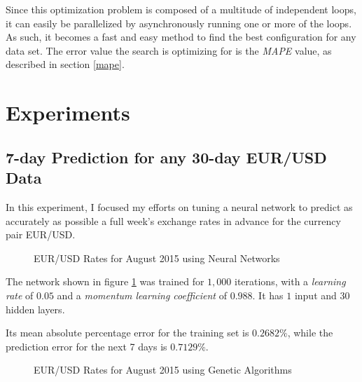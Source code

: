 \documentclass[a4paper,12pt]{article}
\begin{document}
	Since this optimization problem is composed of a multitude of independent loops, it can easily be parallelized by asynchronously running one or more of the loops. As such, it becomes a fast and easy method to find the best configuration for any data set. The error value the search is optimizing for is the \textit{MAPE} value, as described in section \ref{mape}.
	
\section{Experiments}
\subsection{7-day Prediction for any 30-day EUR/USD Data} \label{pred730nn}
	
	In this experiment, I focused my efforts on tuning a neural network to predict as accurately as possible a full week's exchange rates in advance for the currency pair EUR/USD.
	
	\begin{figure}[!htbp]
		\centering
		\caption{EUR/USD Rates for August 2015 using Neural Networks}
		\label{eur_usd_august_30_neuron}
	\end{figure}
	
	The network shown in figure \ref{eur_usd_august_30_neuron} was trained for $1,000$ iterations, with a \textit{learning rate} of $0.05$ and a \textit{momentum learning coefficient} of $0.988$. It has $1$ input and $30$ hidden layers.
	
	Its mean absolute percentage error for the training set is $0.2682\%$, while the prediction error for the next 7 days is $0.7129\%$.
	
	\begin{figure}[!htbp]
		\centering
		\caption{EUR/USD Rates for August 2015 using Genetic Algorithms}
		\label{eur_usd_august_30_genetic}
	\end{figure}
	
\end{document}
